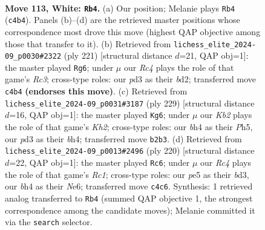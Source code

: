 \documentclass[11pt]{article}
\begin{document}
\clearpage

\begin{figure}[p]\centering
\begin{subfigure}{0.46\textwidth}\centering
\resizebox{\linewidth}{!}{%
\newchessgame
\chessboard[
  setfen={5n2/8/7p/r3p3/2R4b/3p2k1/1K6/8 w - - 22 113},
  showmover=false,
  pgfstyle=straightmove, color=movearrow, markmove={c4-b4}
]}
\caption{}
\end{subfigure}\hfill
\begin{subfigure}{0.46\textwidth}\centering
\resizebox{\linewidth}{!}{%
\newchessgame
\chessboard[
  setfen={4k3/7R/2r5/P2K4/8/8/3Bb3/8 b - - 72 111},
  showmover=false,
  pgfstyle=straightmove, color=movearrow, markmove={c6-g6}
]}
\caption{}
\end{subfigure}
\\[4pt]
\begin{subfigure}{0.46\textwidth}\centering
\resizebox{\linewidth}{!}{%
\newchessgame
\chessboard[
  setfen={5R2/7k/4r3/K1P4p/7B/6P1/6b1/8 b - - 46 115},
  showmover=false,
  pgfstyle=straightmove, color=movearrow, markmove={h7-g6}
]}
\caption{}
\end{subfigure}\hfill
\begin{subfigure}{0.46\textwidth}\centering
\resizebox{\linewidth}{!}{%
\newchessgame
\chessboard[
  setfen={8/8/4N3/8/4p3/1k1bP1K1/r7/2R5 w - - 84 111},
  showmover=false,
  pgfstyle=straightmove, color=movearrow, markmove={c1-c6}
]}
\caption{}
\end{subfigure}
\caption{\textbf{Move 113, White: \texttt{Rb4}.} (a) Our position; Melanie plays \texttt{Rb4} (\texttt{c4b4}). Panels (b)--(d) are the retrieved master positions whose correspondence most drove this move (highest QAP objective among those that transfer to it). (b) Retrieved from \texttt{lichess\_elite\_2024-09\_p0030\#2322} (ply 221) [structural distance $d$=21, QAP obj=1]: the master played \texttt{Rg6}; under $\mu$ our \emph{Rc4} plays the role of that game's \emph{Rc3}; cross-type roles: our \emph{p}d3 as their \emph{b}d2; transferred move \texttt{c4b4} \textbf{(endorses this move)}. (c) Retrieved from \texttt{lichess\_elite\_2024-09\_p0031\#3187} (ply 229) [structural distance $d$=16, QAP obj=1]: the master played \texttt{Kg6}; under $\mu$ our \emph{Kb2} plays the role of that game's \emph{Kh2}; cross-type roles: our \emph{b}h4 as their \emph{P}h5, our \emph{p}d3 as their \emph{b}h4; transferred move \texttt{b2b3}. (d) Retrieved from \texttt{lichess\_elite\_2024-09\_p0013\#2496} (ply 220) [structural distance $d$=22, QAP obj=1]: the master played \texttt{Rc6}; under $\mu$ our \emph{Rc4} plays the role of that game's \emph{Rc1}; cross-type roles: our \emph{p}e5 as their \emph{b}d3, our \emph{b}h4 as their \emph{N}e6; transferred move \texttt{c4c6}. Synthesis: 1 retrieved analog transferred to \texttt{Rb4} (summed QAP objective 1, the strongest correspondence among the candidate moves); Melanie committed it via the \texttt{search} selector.}
\label{fig:thought-m224}
\end{figure}
\end{document}
